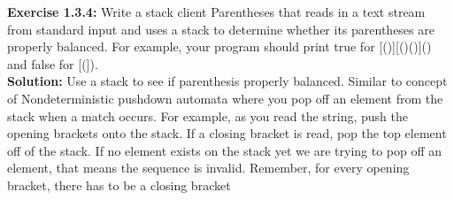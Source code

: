 \documentclass[11pt,fleqn]{article}
\begin{document}
\textbf{Exercise 1.3.4:} Write a stack client Parentheses that reads in a text stream from standard input
and uses a stack to determine whether its parentheses are properly balanced. For example,
your program should print true for [()]{}{[()()]()} and false for [(]).\\

\textbf{Solution:} Use a stack to see if parenthesis properly balanced. Similar to concept of Nondeterministic pushdown automata where you pop off an element from the stack when a match occurs. For example, as you read the string, push the opening brackets onto the stack. If a closing bracket is read, pop the top element off of the stack. If no element exists on the stack yet we are trying to pop off an element, that means the sequence is invalid. Remember, for every opening bracket, there has to be a closing bracket
\end{document}
